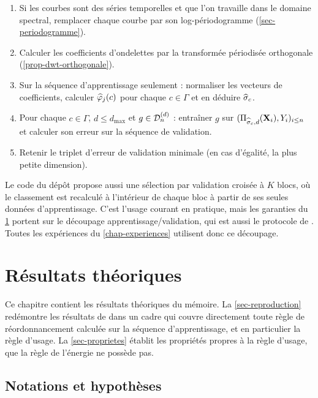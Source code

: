\begin{enumerate}[label=\arabic*.]
  \item Si les courbes sont des séries temporelles et que l'on travaille dans le domaine spectral, remplacer chaque courbe par son log-périodogramme (\cref{sec-periodogramme}).
  \item Calculer les coefficients d'ondelettes par la transformée périodisée orthogonale (\cref{prop-dwt-orthogonale}).
  \item Sur la séquence d'apprentissage seulement : normaliser les vecteurs de coefficients, calculer $\widehat{\varphi}_j(c)$ pour chaque $c\in\Gamma$ et en déduire $\widehat{\sigma}_c$.
  \item Pour chaque $c\in\Gamma$, $d\le d_{\max}$ et $g\in\mathcal{D}_n^{(d)}$ : entraîner $g$ sur $(\Pi_{\widehat{\sigma}_c,d}(\mathbf{X}_i),Y_i)_{i\le n}$ et calculer son erreur sur la séquence de validation.
  \item Retenir le triplet d'erreur de validation minimale (en cas d'égalité, la plus petite dimension).
\end{enumerate}

\begin{remarque}
Le code du dépôt propose aussi une sélection par validation croisée à $K$ blocs, où le classement est recalculé à l'intérieur de chaque bloc à partir de ses seules données d'apprentissage. C'est l'usage courant en pratique, mais les garanties du \cref{chap-theorie} portent sur le découpage apprentissage/validation, qui est aussi le protocole de \citet{berlinet2008functional}. Toutes les expériences du \cref{chap-experiences} utilisent donc ce découpage.
\end{remarque}

\chapter{Résultats théoriques}\label{chap-theorie}

Ce chapitre contient les résultats théoriques du mémoire. La \cref{sec-reproduction} redémontre les résultats de \citet{berlinet2008functional} dans un cadre qui couvre directement toute règle de réordonnancement calculée sur la séquence d'apprentissage, et en particulier la règle d'usage. La \cref{sec-proprietes} établit les propriétés propres à la règle d'usage, que la règle de l'énergie ne possède pas.

\section{Notations et hypothèses}\label{sec-notations}

